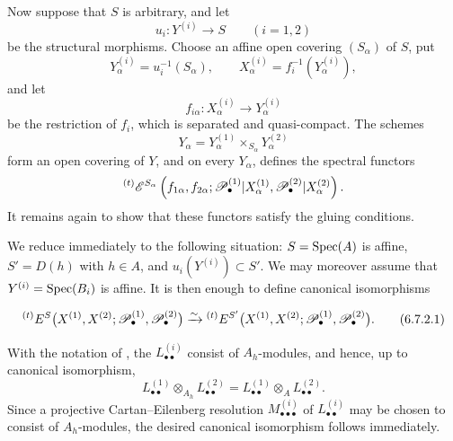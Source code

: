 \begin{env}[6.7.2]
\label{III.6.7.2}
Now suppose that $S$ is arbitrary, and let
\[
  u_i:Y^{(i)}\longrightarrow S
  \qquad(i=1,2)
\]
be the structural morphisms.  Choose an affine open covering
$(S_\alpha)$ of $S$, put
\[
  Y_\alpha^{(i)}=u_i^{-1}(S_\alpha),
  \qquad
  X_\alpha^{(i)}=f_i^{-1}(Y_\alpha^{(i)}),
\]
and let
\[
  f_{i\alpha}:X_\alpha^{(i)}\longrightarrow Y_\alpha^{(i)}
\]
be the restriction of $f_i$, which is separated and
quasi-compact.  The schemes
\[
  Y_\alpha
  =
  Y_\alpha^{(1)}
  \times_{S_\alpha}Y_\alpha^{(2)}
\]
form an open covering of $Y$, and on every $Y_\alpha$,
 defines the spectral functors
\[
  {}^{(t)}\mathscr{E}^{S_\alpha}
  \left(
    f_{1\alpha},f_{2\alpha};
    \mathscr{P}_\bullet^{(1)}|X_\alpha^{(1)},
    \mathscr{P}_\bullet^{(2)}|X_\alpha^{(2)}
  \right).
\]
It remains again to show that these functors satisfy the gluing
conditions.

We reduce immediately to the following situation:
$S=\operatorname{Spec}(A)$ is affine,
$S'=D(h)$ with $h\in A$, and
$u_i(Y^{(i)})\subset S'$.  We may moreover assume that
$Y^{(i)}=\operatorname{Spec}(B_i)$ is affine.  It is then enough to define
canonical isomorphisms
\begin{env}[6.7.2.1]
\label{III.6.7.2.1}
\[
  {}^{(t)}E^S
  \bigl(
    X^{(1)},X^{(2)};
    \sh P_\bullet^{(1)},\sh P_\bullet^{(2)}
  \bigr)
  \xrightarrow{\sim}
  {}^{(t)}E^{S'}
  \bigl(
    X^{(1)},X^{(2)};
    \sh P_\bullet^{(1)},\sh P_\bullet^{(2)}
  \bigr).
  \tag{6.7.2.1}\label{III.6.7.2.1.eq}
\]
\end{env}
With the notation of , the
$L_{\bullet\bullet}^{(i)}$ consist of $A_h$-modules, and hence,
up to canonical isomorphism,
\[
  L_{\bullet\bullet}^{(1)}
  \otimes_{A_h}L_{\bullet\bullet}^{(2)}
  =
  L_{\bullet\bullet}^{(1)}
  \otimes_A L_{\bullet\bullet}^{(2)}.
\]
Since a projective Cartan--Eilenberg resolution
$M_{\bullet\bullet\bullet}^{(i)}$ of $L_{\bullet\bullet}^{(i)}$ may be
chosen to consist of $A_h$-modules, the desired canonical
isomorphism follows immediately.
\end{env}

